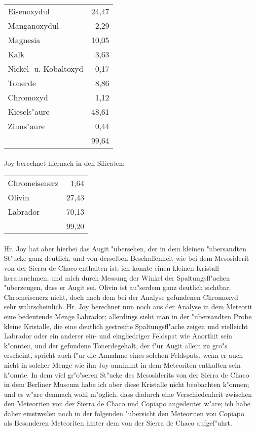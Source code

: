 \documentclass[a4paper, 11pt, oneside, german]{article}
\begin{document}
\begin{center}
\begin{tabular}{ l r }
    Eisenoxydul & 24,47\\
    Manganoxydul & 2,29\\
    Magnesia & 10,05\\
    Kalk & 3,63\\
    Nickel- u. Kobaltoxyd & 0,17\\
    Tonerde & 8,86\\
    Chromoxyd & 1,12\\
    Kiesels"aure & 48,61\\
    Zinns"aure & 0,44\\
     & 99,64\\
\end{tabular}
\end{center}
\paragraph{}
Joy berechnet hiernach in den Silicaten:
\begin{center}
\begin{tabular}{ l r }
    Chromeisenerz & 1,64\\
    Olivin & 27,43\\
    Labrador & 70,13\\
     & 99,20\\
\end{tabular}
\end{center}
\paragraph{}
Hr. Joy hat aber hierbei das Augit "ubersehen, der in dem kleinen "ubersandten St"ucke ganz deutlich, und von derselben Beschaffenheit wie bei dem Mesosiderit von der Sierra de Chaco enthalten ist; ich konnte einen kleinen Kristall herausnehmen, und mich durch Messung der Winkel der Spaltungsfl"achen "uberzeugen, dass er Augit sei. Olivin ist au"serdem ganz deutlich sichtbar, Chromeisenerz nicht, doch nach dem bei der Analyse gefundenen Chromoxyd sehr wahrscheinlich. Hr. Joy berechnet nun noch aus der Analyse in dem Meteorit eine bedeutende Menge Labrador; allerdings sieht man in der "ubersandten Probe kleine Kristalle, die eine deutlich gestreifte Spaltungsfl"ache zeigen und vielleicht Labrador oder ein anderer ein- und eingliedriger Feldspat wie Anorthit sein k"onnten, und der gefundene Tonerdegehalt, der f"ur Augit allein zu gro"s erscheint, spricht auch f"ur die Annahme eines solchen Feldspats, wenn er auch nicht in solcher Menge wie ihn Joy annimmt in dem Meteoriten enthalten sein k"onnte. In dem viel gr"o"seren St"ucke des Mesosiderits von der Sierra de Chaco in dem Berliner Museum habe ich aber diese Kristalle nicht beobachten k"onnen; und es w"are demnach wohl m"oglich, dass dadurch eine Verschiedenheit zwischen den Meteoriten von der Sierra de Chaco und Copiapo angedeutet w"are; ich habe daher einstweilen noch in der folgenden "ubersicht den Meteoriten von Copiapo als Besonderen Meteoriten hinter dem von der Sierra de Chaco aufgef"uhrt.
\end{document}
